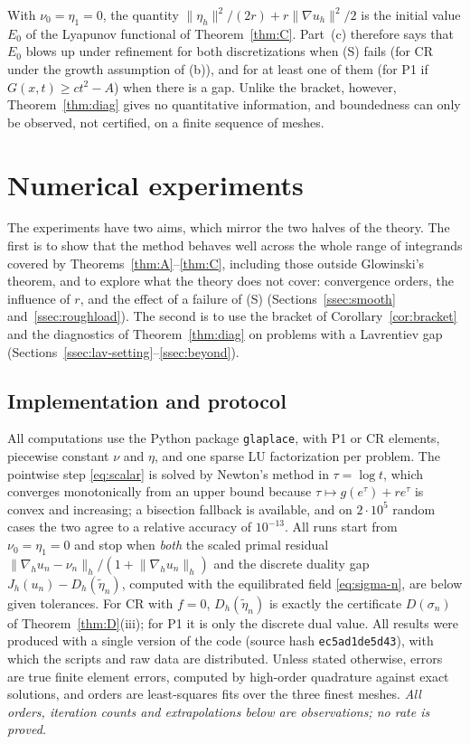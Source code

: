\documentclass[11pt]{amsart}
\theoremstyle{definition}
\theoremstyle{remark}
\numberwithin{equation}{section}
\newcommand{\norm}[1]{\lVert #1\rVert}
\begin{document}
With $\nu_0=\eta_1=0$, the quantity $\norm{\eta_h}^2/(2r)+r\norm{\nabla u_h}^2/2$ is the initial value $E_0$ of the Lyapunov functional of Theorem~\ref{thm:C}. Part~(c) therefore says that $E_0$ blows up under refinement for both discretizations when (S) fails (for CR under the growth assumption of (b)), and for at least one of them (for P1 if $G(x,t)\ge ct^2-A$) when there is a gap. Unlike the bracket, however, Theorem~\ref{thm:diag} gives no quantitative information, and boundedness can only be observed, not certified, on a finite sequence of meshes.


\section{Numerical experiments}\label{sec:numerics}

The experiments have two aims, which mirror the two halves of the theory. The first is to show that the method behaves well across the whole range of integrands covered by Theorems~\ref{thm:A}--\ref{thm:C}, including those outside Glowinski's theorem, and to explore what the theory does not cover: convergence orders, the influence of $r$, and the effect of a failure of (S) (Sections~\ref{ssec:smooth} and~\ref{ssec:roughload}). The second is to use the bracket of Corollary~\ref{cor:bracket} and the diagnostics of Theorem~\ref{thm:diag} on problems with a Lavrentiev gap (Sections~\ref{ssec:lav-setting}--\ref{ssec:beyond}).

\subsection{Implementation and protocol}\label{ssec:protocol}
All computations use the Python package \texttt{glaplace}, with P1 or CR elements, piecewise constant $\nu$ and $\eta$, and one sparse LU factorization per problem. The pointwise step \eqref{eq:scalar} is solved by Newton's method in $\tau=\log t$, which converges monotonically from an upper bound because $\tau\mapsto g(e^\tau)+re^\tau$ is convex and increasing; a bisection fallback is available, and on $2\cdot10^5$ random cases the two agree to a relative accuracy of $10^{-13}$. All runs start from $\nu_0=\eta_1=0$ and stop when \emph{both} the scaled primal residual $\norm{\nabla_hu_n-\nu_n}_h/(1+\norm{\nabla_hu_n}_h)$ and the discrete duality gap $J_h(u_n)-D_h(\tilde\eta_n)$, computed with the equilibrated field \eqref{eq:sigma-n}, are below given tolerances. For CR with $f=0$, $D_h(\tilde\eta_n)$ is exactly the certificate $D(\sigma_n)$ of Theorem~\ref{thm:D}(iii); for P1 it is only the discrete dual value. All results were produced with a single version of the code (source hash \texttt{ec5ad1de5d43}), with which the scripts and raw data are distributed. Unless stated otherwise, errors are true finite element errors, computed by high-order quadrature against exact solutions, and orders are least-squares fits over the three finest meshes. \emph{All orders, iteration counts and extrapolations below are observations; no rate is proved.}
\end{document}
